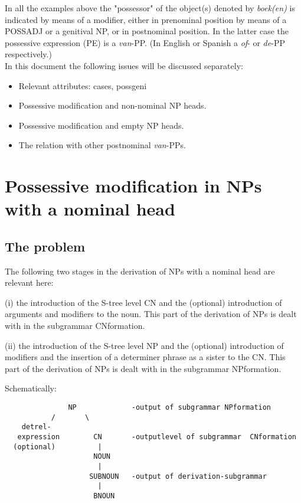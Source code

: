 \noindent
In all the examples above the "possessor"
of the object(s) denoted by {\em boek(en)} is indicated by means of a modifier,
 either in prenominal position by means of a POSSADJ or a genitival NP,
or in postnominal position. 
In the latter case
the possessive expression (PE) 
is a {\em van}-PP. (In English or Spanish a {\em of}- 
or {\em de}-PP respectively.)\\



\noindent
In this document the following issues will be discussed separately:

\begin{itemize}
  \item Relevant attributes: cases, possgeni 
  \item Possessive modification and non-nominal NP heads.
  \item Possessive modification and empty NP heads.
  \item The relation with other postnominal {\em van}-PPs.
\end{itemize}

\section{Possessive modification in NPs with a nominal head}
\subsection{The problem}
The following two stages in 
the derivation of NPs with a nominal head 
are relevant here: \\

\begin{description}
  \item 
(i) the introduction of the S-tree level CN and 
the (optional) introduction of arguments and modifiers to the noun. 
This part 
of the derivation of NPs is dealt with in the subgrammar CNformation.
  \item 
(ii) the introduction of the S-tree level NP and the (optional) 
introduction of modifiers 
and the insertion of a determiner phrase as a sister to the CN.
This part 
of the derivation of NPs is dealt with in the subgrammar NPformation.
\end{description}

Schematically:\\


\begin{verbatim}
               NP             -output of subgrammar NPformation
           /       \
    detrel-
   expression        CN       -outputlevel of subgrammar  CNformation
  (optional)          |        
                     NOUN
                      |
                    SUBNOUN   -output of derivation-subgrammar
                      |
                     BNOUN
\end{verbatim}


